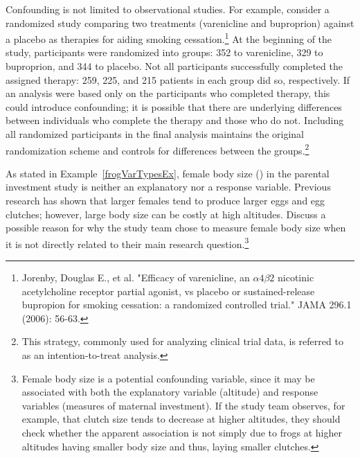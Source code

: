 Confounding is not limited to observational studies. For example, consider a randomized study comparing two treatments (varenicline and buproprion) against a placebo as therapies for aiding smoking cessation.\footnote{Jorenby, Douglas E., et al. "Efficacy of varenicline, an $\alpha4\beta2$ nicotinic acetylcholine receptor partial agonist, vs placebo or sustained-release bupropion for smoking cessation: a randomized controlled trial." JAMA 296.1 (2006): 56-63.} At the beginning of the study, participants were randomized into groups: 352 to varenicline, 329 to buproprion, and 344 to placebo. Not all participants successfully completed the assigned therapy: 259, 225, and 215 patients in each group did so, respectively. If an analysis were based only on the participants who completed therapy, this could introduce confounding; it is possible that there are underlying differences between individuals who complete the therapy and those who do not. Including all randomized participants in the final analysis maintains the original randomization scheme and controls for differences between the groups.\footnote{This strategy, commonly used for analyzing clinical trial data, is referred to as an intention-to-treat analysis.}


\begin{exercise} As stated in Example~\ref{frogVarTypesEx}, female body size () in the parental investment study is neither an explanatory nor a response variable. Previous research has shown that larger females tend to produce larger eggs and egg clutches; however, large body size can be costly at high altitudes. Discuss a possible reason for why the study team chose to measure female body size when it is not directly related to their main research question.\footnote{Female body size is a potential confounding variable, since it may be associated with both the explanatory variable (altitude) and response variables (measures of maternal investment). If the study team observes, for example, that clutch size tends to decrease at higher altitudes, they should check whether the apparent association is not simply due to frogs at higher altitudes having smaller body size and thus, laying smaller clutches. }
\end{exercise}



